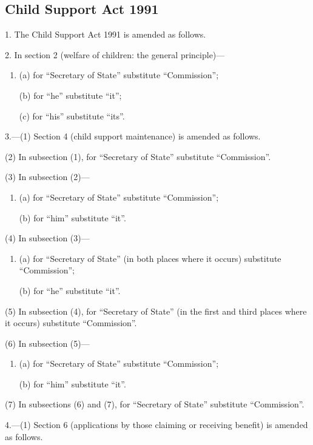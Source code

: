 \documentclass[a4paper]{article}
\begin{document}
\subsection*{Child Support Act 1991}

1. The Child Support Act 1991 is amended as follows.

\medskip

2. In section 2 (welfare of children: the general principle)—
\begin{enumerate}\item[]
(a) for “Secretary of State” substitute “Commission”;

(b) for “he” substitute “it”;

(c) for “his” substitute “its”.
\end{enumerate}

\medskip

3.---(1) Section 4 (child support maintenance) is amended as follows.

(2) In subsection (1), for “Secretary of State” substitute “Commission”.

(3) In subsection (2)—
\begin{enumerate}\item[]
(a) for “Secretary of State” substitute “Commission”;

(b) for “him” substitute “it”.
\end{enumerate}

(4) In subsection (3)—
\begin{enumerate}\item[]
(a) for “Secretary of State” (in both places where it occurs) substitute “Commission”;

(b) for “he” substitute “it”.
\end{enumerate}

(5) In subsection (4), for “Secretary of State” (in the first and third places where it occurs) substitute “Commission”.

(6) In subsection (5)—
\begin{enumerate}\item[]
(a) for “Secretary of State” substitute “Commission”;

(b) for “him” substitute “it”.
\end{enumerate}

(7) In subsections (6) and (7), for “Secretary of State” substitute “Commission”.

\medskip

4.---(1) Section 6 (applications by those claiming or receiving benefit) is amended as follows.
\end{document}
